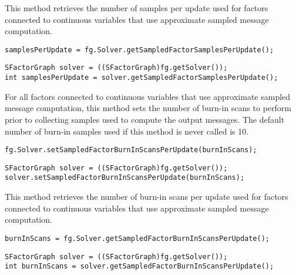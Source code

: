 
This method retrieves the number of samples per update used for factors connected to continuous variables that use approximate sampled message computation.

\ifmatlab
\begin{lstlisting}
samplesPerUpdate = fg.Solver.getSampledFactorSamplesPerUpdate();
\end{lstlisting}
\fi

\ifjava
\begin{lstlisting}
SFactorGraph solver = ((SFactorGraph)fg.getSolver());
int samplesPerUpdate = solver.getSampledFactorSamplesPerUpdate();
\end{lstlisting}
\fi



For all factors connected to continuous variables that use approximate sampled message computation, this method sets the number of burn-in scans to perform prior to collecting samples used to compute the output messages.  The default number of burn-in samples used if this method is never called is 10.

\ifmatlab
\begin{lstlisting}
fg.Solver.setSampledFactorBurnInScansPerUpdate(burnInScans);
\end{lstlisting}
\fi

\ifjava
\begin{lstlisting}
SFactorGraph solver = ((SFactorGraph)fg.getSolver());
solver.setSampledFactorBurnInScansPerUpdate(burnInScans);
\end{lstlisting}
\fi



This method retrieves the number of burn-in scans per update used for factors connected to continuous variables that use approximate sampled message computation.

\ifmatlab
\begin{lstlisting}
burnInScans = fg.Solver.getSampledFactorBurnInScansPerUpdate();
\end{lstlisting}
\fi

\ifjava
\begin{lstlisting}
SFactorGraph solver = ((SFactorGraph)fg.getSolver());
int burnInScans = solver.getSampledFactorBurnInScansPerUpdate();
\end{lstlisting}
\fi



